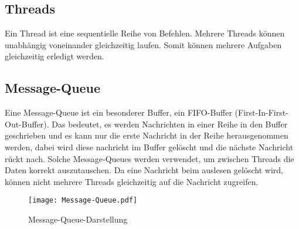 \subsection{Threads}
Ein Thread ist eine sequentielle Reihe von Befehlen. Mehrere Threads können unabhängig voneinander gleichzeitig laufen. Somit können mehrere Aufgaben gleichzeitig erledigt werden. 

\subsection{Message-Queue}
Eine Message-Queue ist ein besonderer Buffer, ein FIFO-Buffer (First-In-First-Out-Buffer). Das bedeutet, es werden Nachrichten in einer Reihe in den Buffer geschrieben und es kann nur die
erste Nachricht in der Reihe herausgenommen werden, dabei wird diese nachricht im Buffer gelöscht und die nächste Nachricht rückt nach. 
Solche Message-Queues werden verwendet, um zwischen Threads die Daten korrekt auszutauschen. Da eine Nachricht beim auslesen gelöscht wird, können nicht mehrere Threads gleichzeitig auf 
die Nachricht zugreifen. 
\begin{figure}[!ht]
    \centering
    \texttt{[image: Message-Queue.pdf]}
    \caption{Message-Queue-Darstellung}
    \label{fig:Message-Queue-Darstellung}
\end{figure}